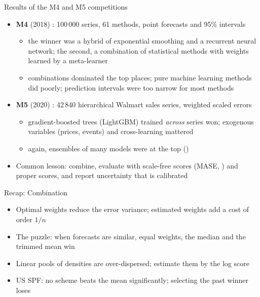 \begin{frame}{Results of the M4 and M5 competitions}
\itemsize{\small}
\begin{itemize}
    \item \textbf{M4} (2018) : 100\,000 series, 61 methods, point forecasts and 95\% intervals
    \begin{itemize}
        \item the winner was a hybrid of exponential smoothing and a recurrent neural network; the second, a combination of statistical methods with weights learned by a meta-learner
        \item combinations dominated the top places; pure machine learning methods did poorly; prediction intervals were too narrow for most methods
    \end{itemize}
    \item \textbf{M5} (2020) : 42\,840 hierarchical Walmart sales series, weighted scaled errors
    \begin{itemize}
        \item gradient-boosted trees (LightGBM) trained \emph{across} series won; exogenous variables (prices, events) and cross-learning mattered
        \item again, ensembles of many models were at the top ()
    \end{itemize}
    \item Common lesson: combine, evaluate with scale-free scores (MASE, ) and proper scores, and report uncertainty that is calibrated
\end{itemize}
\end{frame}

\begin{frame}{Recap: Combination}
\itemsize{\small}
\begin{itemize}
    \item Optimal weights reduce the error variance; estimated weights add a cost of order $1/n$
    \item The puzzle: when forecasts are similar, equal weights, the median and the trimmed mean win
    \item Linear pools of densities are over-dispersed; estimate them by the log score
    \item US SPF: no scheme beats the mean significantly; selecting the past winner loses
\end{itemize}
\end{frame}


